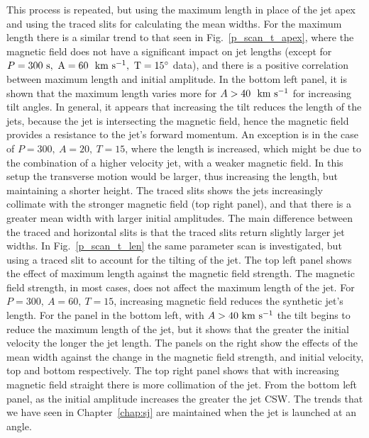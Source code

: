 This process is repeated, but using the maximum length in place of the jet apex and using the traced slits for calculating the mean widths. For the maximum length there is a similar trend to that seen in Fig.~\ref{p_scan_t_apex}, where the magnetic field does not have a significant impact on jet lengths (except for $P=300~\rm{s},~A=60~~\rm{km ~s^{-1}},~T=15^{\circ}$ data), and there is a positive correlation between maximum length and initial amplitude. In the bottom left panel, it is shown that the maximum length varies more for $A>40~~\rm{km ~s^{-1}}$ for increasing tilt angles. In general, it appears that increasing the tilt reduces the length of the jets, because the jet is intersecting the magnetic field, hence the magnetic field provides a resistance to the jet's forward momentum. An exception is in the case of $P=300,~A=20,~T=15$, where the length is increased, which might be due to the combination of a higher velocity jet, with a weaker magnetic field. In this setup the transverse motion would be larger, thus increasing the length, but maintaining a shorter height. The traced slits shows the jets increasingly collimate with the stronger magnetic field (top right panel), and that there is a greater mean width with larger initial amplitudes. The main difference between the traced and horizontal slits is that the traced slits return slightly larger jet widths.\np
%
In Fig.~\ref{p_scan_t_len} the same parameter scan is investigated, but using a traced slit to account for the tilting of the jet. The top left panel shows the effect of maximum length against the magnetic field strength. The magnetic field strength, in most cases, does not affect the maximum length of the jet. For $P=300,~A=60,~T=15$, increasing magnetic field reduces the synthetic jet's length. For the panel in the bottom left, with $A>40 ~\rm{km ~s^{-1}}$ the tilt begins to reduce the maximum length of the jet, but it shows that the greater the initial velocity the longer the jet length. The panels on the right show the effects of the mean width against the change in the magnetic field strength, and initial velocity, top and bottom respectively. The top right panel shows that with increasing magnetic field straight there is more collimation of the jet. From the bottom left panel, as the initial amplitude increases the greater the jet CSW. The trends that we have seen in Chapter~\ref{chap:sj} are maintained when the jet is launched at an angle.  \np
%
